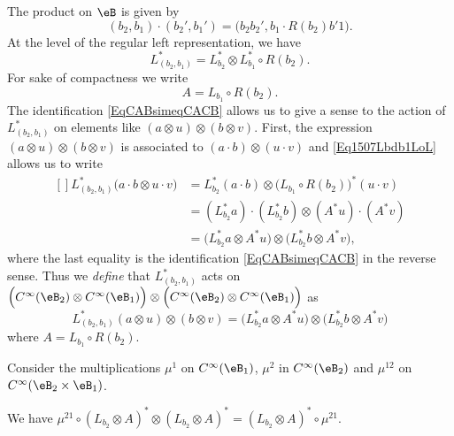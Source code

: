 The product on $\eB$ is given by
\begin{equation}
	(b_2,b_1)\cdot (b_2',b_1')=\big( b_2b_2',b_1\cdot R(b_2)b'1 \big).
\end{equation}
At the level of the regular left representation, we have
\begin{equation}	\label{Eq1507Lbdb1LoL}
	L^*_{(b_2,b_1)}=L^*_{b_2}\otimes L^*_{b_1}\circ R(b_2).
\end{equation}
For sake of compactness we write
\begin{equation}
	A=L_{b_1}\circ R(b_2).
\end{equation}
The identification \eqref{EqCABsimeqCACB} allows us to give a sense to the action of $L^*_{(b_2,b_1)}$ on elements like $(a\otimes u)\otimes(b\otimes v)$. First, the expression $(a\otimes u)\otimes(b\otimes v)$ is associated to $(a\cdot b)\otimes(u\cdot v)$ and \eqref{Eq1507Lbdb1LoL} allows us to write
\begin{equation}
	\begin{aligned}[]
		L^*_{(b_2,b_1)}\big( a\cdot b\otimes u\cdot v \big)&=L^*_{b_2}(a\cdot b)\otimes \big( L_{b_1}\circ R(b_2) \big)^*(u\cdot v)\\
		&=(L^*_{b_2}a)\cdot(L^*_{b_2}b)\otimes (A^*u)\cdot (A^*v)\\
		&=\big( L^*_{b_2}a\otimes A^*u \big)\otimes\big( L^*_{b_2}b\otimes A^*v \big),
	\end{aligned}
\end{equation}
where the last equality is the identification \eqref{EqCABsimeqCACB} in the reverse sense. Thus we \emph{define} that $L^*_{(b_2,b_1)}$ acts on $\Big(  C^{\infty}(\eB_2)\otimes C^{\infty}(\eB_1) \Big)\otimes\Big(  C^{\infty}(\eB_2)\otimes C^{\infty}(\eB_1) \Big)$ as
\begin{equation}		\label{Eq1507LsurBBBB}
	L^*_{(b_2,b_1)}(a\otimes u)\otimes(b\otimes v)=\big( L^*_{b_2}a\otimes A^*u \big)\otimes\big( L^*_{b_2}b\otimes A^*v \big)
\end{equation}
where $A=L_{b_1}\circ R(b_2)$.

Consider the multiplications $\mu^1$ on $ C^{\infty}(\eB_1)$, $\mu^2$ in $ C^{\infty}(\eB_2)$ and $\mu^{12}$ on $ C^{\infty}(\eB_2\times \eB_1)$. 

\begin{lemma}		\label{Lem1607mualalmu}
	We have $\mu^{21}\circ(L_{b_2}\otimes A)^*\otimes(L_{b_2}\otimes A)^*=(L_{b_2}\otimes A)^*\circ\mu^{21}$.
\end{lemma}

